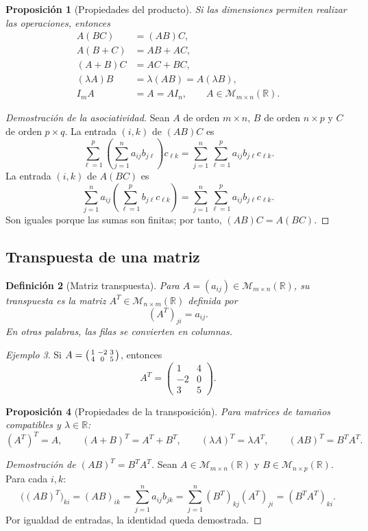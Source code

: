 \documentclass[12pt]{article}
\newtheorem{definicion}{Definición}[section]
\newtheorem{proposicion}[definicion]{Proposición}
\theoremstyle{remark}
\newtheorem{ejemplo}[definicion]{Ejemplo}
\newcommand{\R}{\mathbb{R}}
\newcommand{\Mat}[2]{\mathcal{M}_{#1\times #2}}
\begin{document}
\begin{proposicion}[Propiedades del producto]
Si las dimensiones permiten realizar las operaciones, entonces
\begin{align*}
A(BC)&=(AB)C,\\
A(B+C)&=AB+AC,\\
(A+B)C&=AC+BC,\\
(\lambda A)B&=\lambda(AB)=A(\lambda B),\\
I_mA&=A=AI_n,\qquad A\in\Mat{m}{n}(\R).
\end{align*}
\end{proposicion}
\begin{proof}[Demostración de la asociatividad]
Sean $A$ de orden $m\times n$, $B$ de orden $n\times p$ y $C$ de orden $p\times q$. La entrada $(i,k)$ de $(AB)C$ es
\[
\sum_{\ell=1}^{p}\left(\sum_{j=1}^{n}a_{ij}b_{j\ell}\right)c_{\ell k}
=\sum_{j=1}^{n}\sum_{\ell=1}^{p}a_{ij}b_{j\ell}c_{\ell k}.
\]
La entrada $(i,k)$ de $A(BC)$ es
\[
\sum_{j=1}^{n}a_{ij}\left(\sum_{\ell=1}^{p}b_{j\ell}c_{\ell k}\right)
=\sum_{j=1}^{n}\sum_{\ell=1}^{p}a_{ij}b_{j\ell}c_{\ell k}.
\]
Son iguales porque las sumas son finitas; por tanto, $(AB)C=A(BC)$.
\end{proof}

\subsection{Transpuesta de una matriz}
\begin{definicion}[Matriz transpuesta]
Para $A=(a_{ij})\in\Mat{m}{n}(\R)$, su \emph{transpuesta} es la matriz $A^T\in\Mat{n}{m}(\R)$ definida por
\[
(A^T)_{ji}=a_{ij}.
\]
En otras palabras, las filas se convierten en columnas.
\end{definicion}
\begin{ejemplo}
Si $A=\begin{psmallmatrix}1&-2&3\\4&0&5\end{psmallmatrix}$, entonces
\[
A^T=\begin{pmatrix}1&4\\-2&0\\3&5\end{pmatrix}.
\]
\end{ejemplo}

\begin{proposicion}[Propiedades de la transposición]
Para matrices de tamaños compatibles y $\lambda\in\R$:
\[
(A^T)^T=A,\qquad(A+B)^T=A^T+B^T,\qquad
(\lambda A)^T=\lambda A^T,\qquad (AB)^T=B^TA^T.
\]
\end{proposicion}
\begin{proof}[Demostración de $(AB)^T=B^TA^T$]
Sean $A\in\Mat{m}{n}(\R)$ y $B\in\Mat{n}{p}(\R)$. Para cada $i,k$:
\[
\bigl((AB)^T\bigr)_{ki}=(AB)_{ik}
=\sum_{j=1}^{n}a_{ij}b_{jk}
=\sum_{j=1}^{n}(B^T)_{kj}(A^T)_{ji}
=(B^TA^T)_{ki}.
\]
Por igualdad de entradas, la identidad queda demostrada.
\end{proof}
\end{document}
